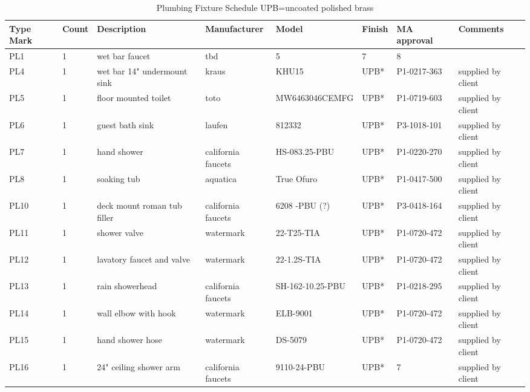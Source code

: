 \documentclass{article}
\begin{document}
\begin{sidewaystable}[h!]
\begin{center}

\caption{\large Plumbing Fixture Schedule \tiny *UPB=uncoated polished brass}
\begin{tabular}{l|l|l|l|l|l|l|l}
\textbf{Type Mark} & \textbf{Count} & \textbf{Description} & \textbf{Manufacturer} & \textbf{Model} & \textbf{Finish} & \textbf{MA approval}  & \textbf{Comments} \\
\hline
\hline
PL1   & 1  & wet bar faucet & tbd & 5 & 7 & 8 \\ 
\hline
PL4   & 1  & wet bar 14" undermount sink & kraus & KHU15 & UPB* & P1-0217-363 & supplied by client \\ 
\hline
PL5   & 1  & floor mounted toilet & toto & MW6463046CEMFG & UPB* & P1-0719-603 & supplied by client \\
\hline
PL6   & 1  & guest bath sink & laufen & 812332 & UPB* & P3-1018-101 & supplied by client \\
\hline
PL7   & 1  & hand shower & california faucets & HS-083.25-PBU &UPB* & P1-0220-270 & supplied by client \\
\hline
PL8   & 1  & soaking tub & aquatica & True Ofuro &UPB* & P1-0417-500 & supplied by client \\
\hline
PL10 & 1  & deck mount roman tub filler & california faucets & 6208 -PBU (?) & UPB* & P3-0418-164  & supplied by client \\
\hline
PL11 & 1  & shower valve & watermark & 22-T25-TIA  & UPB* & P1-0720-472  & supplied by client \\
\hline
PL12 & 1  & lavatory faucet and valve & watermark & 22-1.2S-TIA & UPB* & P1-0720-472 & supplied by client \\
\hline
PL13 & 1  & rain showerhead & california faucets & SH-162-10.25-PBU & UPB* &  P1-0218-295 & supplied by client \\
\hline
PL14 & 1  & wall elbow with hook & watermark & ELB-9001 & UPB* & P1-0720-472 & supplied by client \\
\hline
PL15 & 1  & hand shower hose & watermark & DS-5079  & UPB* & P1-0720-472 & supplied by client \\
\hline
PL16 & 1  & 24" ceiling shower arm & california faucets & 9110-24-PBU  &UPB* & 7 & supplied by client \\

\end{tabular}
\end{center}
\end{sidewaystable}
\end{document}
